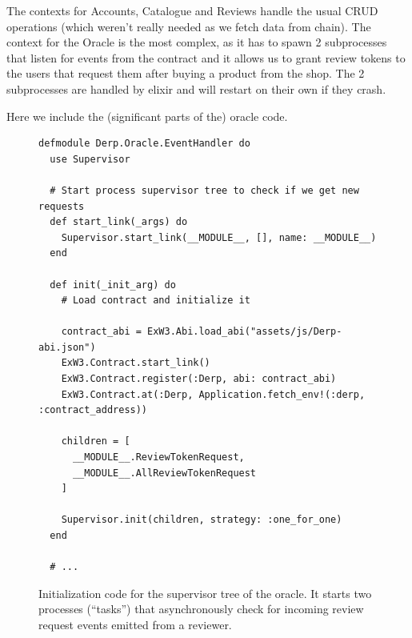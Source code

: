 \documentclass[12pt,a4paper,oneside]{article}
\theoremstyle{definition}
\begin{document}
The contexts for Accounts, Catalogue and Reviews handle the usual CRUD operations (which weren't really needed as we fetch data from chain).
The context for the Oracle is the most complex, as it has to spawn 2 subprocesses that listen for events from the contract and it allows us to grant review tokens to the users that request them after buying a product from the shop. The 2 subprocesses are handled by elixir and will restart on their own if they crash.

Here we include the (significant parts of the) oracle code.

\begin{figure}[H]
	\begin{verbatim}
defmodule Derp.Oracle.EventHandler do
  use Supervisor

  # Start process supervisor tree to check if we get new requests
  def start_link(_args) do
    Supervisor.start_link(__MODULE__, [], name: __MODULE__)
  end

  def init(_init_arg) do
    # Load contract and initialize it

    contract_abi = ExW3.Abi.load_abi("assets/js/Derp-abi.json")
    ExW3.Contract.start_link()
    ExW3.Contract.register(:Derp, abi: contract_abi)
    ExW3.Contract.at(:Derp, Application.fetch_env!(:derp, :contract_address))

    children = [
      __MODULE__.ReviewTokenRequest,
      __MODULE__.AllReviewTokenRequest
    ]

    Supervisor.init(children, strategy: :one_for_one)
  end

  # ...
    \end{verbatim}
	\label{code:oracle-init}
	\caption{Initialization code for the supervisor tree of the oracle. It starts two processes (``tasks'') that asynchronously check for incoming review request events emitted from a reviewer.}
\end{figure}
\end{document}
